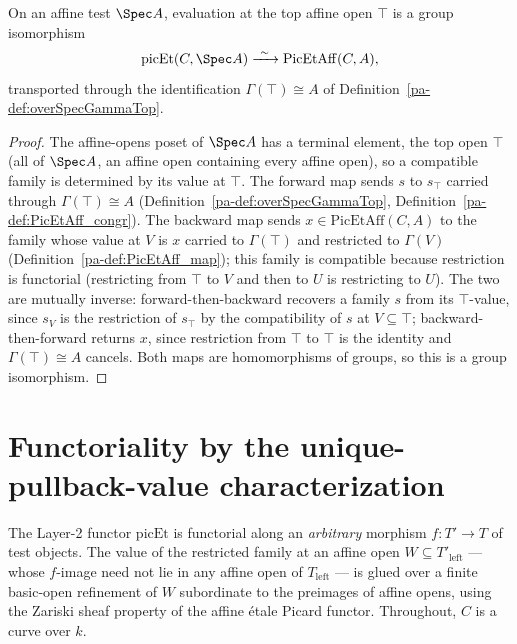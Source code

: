 \begin{definition}
  \label{pa-def:picEtAffineEquiv}
  \leanok

  On an affine test \(\Spec A\), evaluation at the top affine open \(\top\) is a group isomorphism
  \[
    \mathrm{picEt}(C, \Spec A) \xrightarrow{\ \sim\ } \mathrm{PicEtAff}(C, A),
  \]
  transported through the identification \(\Gamma(\top) \cong A\) of
  Definition~\ref{pa-def:overSpecGammaTop}.
\end{definition}
\begin{proof}
  \leanok
  The affine-opens poset of \(\Spec A\) has a terminal element, the top open \(\top\) (all of
  \(\Spec A\), an affine open containing every affine open), so a compatible family is determined by
  its value at \(\top\). The forward map sends \(s\) to \(s_\top\) carried through \(\Gamma(\top)
  \cong A\) (Definition~\ref{pa-def:overSpecGammaTop}, Definition~\ref{pa-def:PicEtAff_congr}). The
  backward map sends \(x \in \mathrm{PicEtAff}(C, A)\) to the family whose value at \(V\) is \(x\)
  carried to \(\Gamma(\top)\) and restricted to \(\Gamma(V)\) (Definition~\ref{pa-def:PicEtAff_map});
  this family is compatible because restriction is functorial (restricting from \(\top\) to \(V\)
  and then to \(U\) is restricting to \(U\)). The two are mutually inverse: forward-then-backward
  recovers a family \(s\) from its \(\top\)-value, since \(s_V\) is the restriction of \(s_\top\) by
  the compatibility of \(s\) at \(V \subseteq \top\); backward-then-forward returns \(x\), since
  restriction from \(\top\) to \(\top\) is the identity and \(\Gamma(\top) \cong A\) cancels. Both
  maps are homomorphisms of groups, so this is a group isomorphism.
\end{proof}

\section{Functoriality by the unique-pullback-value characterization}

The Layer-2 functor \(\mathrm{picEt}\) is functorial along an \emph{arbitrary} morphism
\(f \colon T' \to T\) of test objects. The value of the restricted family at an affine open
\(W \subseteq T'_{\mathrm{left}}\) --- whose \(f\)-image need not lie in any affine open of
\(T_{\mathrm{left}}\) --- is glued over a finite basic-open refinement of \(W\) subordinate to the
preimages of affine opens, using the Zariski sheaf property of the affine \'etale Picard functor.
Throughout, \(C\) is a curve over \(k\).

